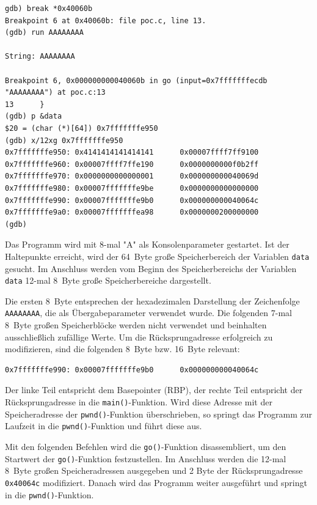 \begin{lstlisting}[basicstyle=\ttfamily\footnotesize]
gdb) break *0x40060b
Breakpoint 6 at 0x40060b: file poc.c, line 13.
(gdb) run AAAAAAAA

String: AAAAAAAA

Breakpoint 6, 0x000000000040060b in go (input=0x7fffffffecdb "AAAAAAAA") at poc.c:13
13      }
(gdb) p &data
$20 = (char (*)[64]) 0x7fffffffe950
(gdb) x/12xg 0x7fffffffe950
0x7fffffffe950: 0x4141414141414141      0x00007ffff7ff9100
0x7fffffffe960: 0x00007ffff7ffe190      0x0000000000f0b2ff
0x7fffffffe970: 0x0000000000000001      0x000000000040069d
0x7fffffffe980: 0x00007fffffffe9be      0x0000000000000000
0x7fffffffe990: 0x00007fffffffe9b0      0x000000000040064c
0x7fffffffe9a0: 0x00007fffffffea98      0x0000000200000000
(gdb)
\end{lstlisting}

Das Programm wird mit 8-mal "A" als Konsolenparameter gestartet. Ist der Haltepunkte erreicht, wird der \SI{64}{Byte} große Speicherbereich der Variablen \texttt{data} gesucht. Im Anschluss werden vom Beginn des Speicherbereichs der Variablen \texttt{data} 12-mal \SI{8}{Byte} große Speicherbereiche dargestellt. 

Die ersten \SI{8}{Byte} entsprechen der hexadezimalen Darstellung der Zeichenfolge \texttt{AAAAAAAA}, die als Übergabeparameter verwendet wurde. Die folgenden 7-mal \SI{8}{Byte} großen Speicherblöcke werden nicht verwendet und beinhalten ausschließlich zufällige Werte. Um die Rücksprungadresse erfolgreich zu modifizieren, sind die folgenden \SI{8}{Byte} bzw. \SI{16}{Byte} relevant:

\begin{lstlisting}[basicstyle=\ttfamily\footnotesize]
0x7fffffffe990: 0x00007fffffffe9b0      0x000000000040064c
\end{lstlisting}

Der linke Teil entspricht dem Basepointer (RBP), der rechte Teil entspricht 
der Rücksprungadresse in die \texttt{main()}-Funktion. Wird diese Adresse 
mit der Speicheradresse der \texttt{pwnd()}-Funktion überschrieben, so 
springt das Programm zur Laufzeit in die \texttt{pwnd()}-Funktion und 
führt diese aus.
 
\newpage 
Mit den folgenden Befehlen wird die \texttt{go()}-Funktion disassembliert, 
um den Startwert der \texttt{go()}-Funktion festzustellen. Im Anschluss 
werden die 12-mal \SI{8}{Byte} großen Speicheradressen 
ausgegeben und 2 Byte der Rücksprungadresse \texttt{0x40064c} modifiziert. 
Danach wird das Programm weiter ausgeführt und springt in die 
\texttt{pwnd()}-Funktion.

